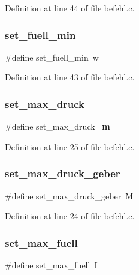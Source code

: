 Definition at line 44 of file befehl.\+c.

\mbox{\label{befehl_8c_a56b66cd9d7b972fca353926e37a8ddf3}} 
\subsubsection{set\+\_\+fuell\+\_\+min}
{\footnotesize\ttfamily \#define set\+\_\+fuell\+\_\+min~\textquotesingle{}w\textquotesingle{}}



Definition at line 43 of file befehl.\+c.

\mbox{\label{befehl_8c_ad71f17ec18a9219a90d1e0cd06ddc990}} 
\subsubsection{set\+\_\+max\+\_\+druck}
{\footnotesize\ttfamily \#define set\+\_\+max\+\_\+druck~\textquotesingle{}\textbf{ m}\textquotesingle{}}



Definition at line 25 of file befehl.\+c.

\mbox{\label{befehl_8c_a2cf7aa7ffa9c63d80afb8814ed3408ca}} 
\subsubsection{set\+\_\+max\+\_\+druck\+\_\+geber}
{\footnotesize\ttfamily \#define set\+\_\+max\+\_\+druck\+\_\+geber~\textquotesingle{}M\textquotesingle{}}



Definition at line 24 of file befehl.\+c.

\mbox{\label{befehl_8c_ae88829b49f9c574ac121843dfd19b1d0}} 
\subsubsection{set\+\_\+max\+\_\+fuell}
{\footnotesize\ttfamily \#define set\+\_\+max\+\_\+fuell~\textquotesingle{}I\textquotesingle{}}




